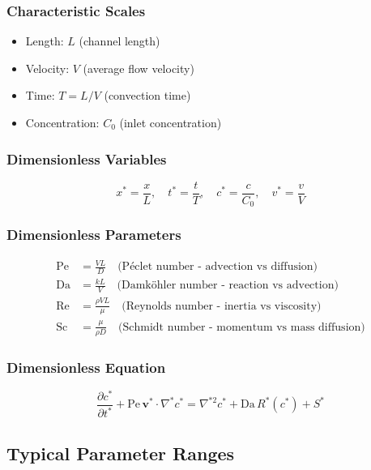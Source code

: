 \documentclass[11pt,a4paper]{article}
\begin{document}
\subsubsection{Characteristic Scales}
\begin{itemize}
    \item Length: $L$ (channel length)
    \item Velocity: $V$ (average flow velocity)
    \item Time: $T = L/V$ (convection time)
    \item Concentration: $C_0$ (inlet concentration)
\end{itemize}

\subsubsection{Dimensionless Variables}
\begin{equation}
x^* = \frac{x}{L}, \quad t^* = \frac{t}{T}, \quad c^* = \frac{c}{C_0}, \quad v^* = \frac{v}{V}
\end{equation}

\subsubsection{Dimensionless Parameters}
\begin{align}
\text{Pe} &= \frac{VL}{D} \quad \text{(Péclet number - advection vs diffusion)}\\
\text{Da} &= \frac{kL}{V} \quad \text{(Damköhler number - reaction vs advection)}\\
\text{Re} &= \frac{\rho VL}{\mu} \quad \text{(Reynolds number - inertia vs viscosity)}\\
\text{Sc} &= \frac{\mu}{\rho D} \quad \text{(Schmidt number - momentum vs mass diffusion)}
\end{align}

\subsubsection{Dimensionless Equation}
\begin{equation}
\frac{\partial c^*}{\partial t^*} + \text{Pe} \, \bm{v}^* \cdot \nabla^* c^* = \nabla^{*2} c^* + \text{Da} \, R^*(c^*) + S^*
\end{equation}

\subsection{Typical Parameter Ranges}
\end{document}
